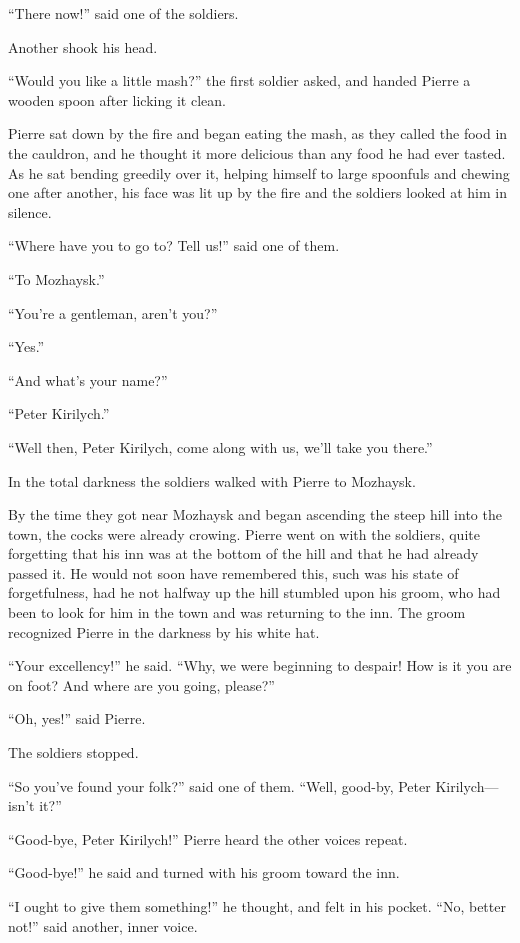 ``There now!'' said one of the soldiers.

Another shook his head.

``Would you like a little mash?'' the first soldier asked, and
handed Pierre a wooden spoon after licking it clean.

Pierre sat down by the fire and began eating the mash, as they
called the food in the cauldron, and he thought it more delicious
than any food he had ever tasted. As he sat bending greedily over
it, helping himself to large spoonfuls and chewing one after
another, his face was lit up by the fire and the soldiers looked
at him in silence.

``Where have you to go to? Tell us!'' said one of them.

``To Mozhaysk.''

``You're a gentleman, aren't you?''

``Yes.''

``And what's your name?''

``Peter Kirilych.''

``Well then, Peter Kirilych, come along with us, we'll take you
there.''

In the total darkness the soldiers walked with Pierre to
Mozhaysk.

By the time they got near Mozhaysk and began ascending the steep
hill into the town, the cocks were already crowing. Pierre went
on with the soldiers, quite forgetting that his inn was at the
bottom of the hill and that he had already passed it. He would
not soon have remembered this, such was his state of
forgetfulness, had he not halfway up the hill stumbled upon his
groom, who had been to look for him in the town and was returning
to the inn. The groom recognized Pierre in the darkness by his
white hat.

``Your excellency!'' he said. ``Why, we were beginning to
despair! How is it you are on foot? And where are you going,
please?''

``Oh, yes!'' said Pierre.

The soldiers stopped.

``So you've found your folk?'' said one of them. ``Well, good-by,
Peter Kirilych---isn't it?''

``Good-bye, Peter Kirilych!'' Pierre heard the other voices
repeat.

``Good-bye!'' he said and turned with his groom toward the inn.

``I ought to give them something!'' he thought, and felt in his
pocket.  ``No, better not!'' said another, inner voice.

